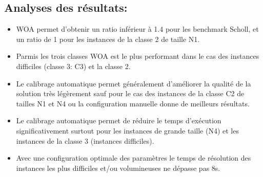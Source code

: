 \documentclass[12pt]{article}
\begin{document}
\subsection{Analyses des résultats: }
\begin{itemize}
    \item WOA permet d'obtenir un ratio inférieur à 1.4 pour les benchmark Scholl, et un ratio de 1 pour les instances de la classe 2 de taille N1.
    \item Parmis les trois classes WOA est le plus performant dans le cas des instances difficiles (classe 3: C3) et la classe 2.
    \item Le calibrage automatique permet généralement d’améliorer la qualité de la solution très légèrement sauf pour le cas des instances de la classe C2 de tailles N1 et N4 ou la configuration manuelle donne de meilleurs résultats.
    \item Le calibrage automatique permet de réduire le temps d’exécution significativement surtout pour les instances de grande taille (N4) et les instances de la classe 3 (instances difficiles).
    \item Avec une configuration optimale des paramètres le temps de résolution des instances les plus difficiles et/ou volumineuses ne dépasse pas 8s.
\end{itemize}
\end{document}
